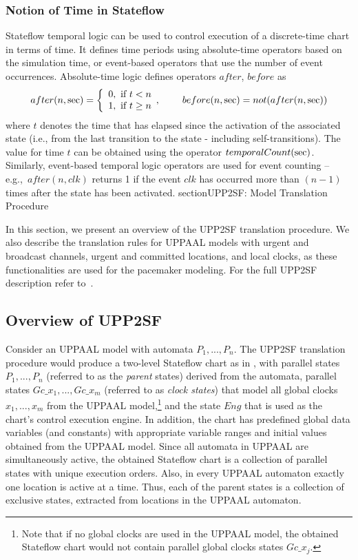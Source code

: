 \subsubsection{Notion of Time in Stateflow}
Stateflow temporal logic can be used to control execution of a discrete-time chart in terms of time. It defines time periods using absolute-time operators based on the simulation time, or event-based operators that use the number of event occurrences. Absolute-time logic defines operators $after$, $before$ as
\begin{equation}
\label{eqn:temp_logic}
after(n, \hbox{sec}) = \left\{
\begin{array}{lr} 0,\hbox{ if } t< n\\
1,\hbox{ if } t\geq n\end{array},
\right.
~~~~~~
before(n, \hbox{sec}) = not(after(n, \hbox{sec}))
\end{equation}
where $t$ denotes the time that has elapsed since the activation of the associated state (i.e., from the last transition to the state - including self-transitions). The value for time $t$ can be obtained using the operator $temporalCount(\hbox{sec})$. Similarly, event-based temporal logic operators are used for event counting -- e.g.,~$after(n,clk)$ returns 1 if the event $clk$ has occurred more than $(n-1)$ times after the state has been activated.
section{UPP2SF: Model Translation Procedure}
\label{sec:upp2sf}

In this section, we present an overview of the UPP2SF translation procedure. We also describe the translation rules for UPPAAL models with urgent and broadcast channels, urgent and committed locations, and local clocks, as these functionalities are used for the pacemaker modeling. For the full UPP2SF description refer to~\cite{upp2sf_rep}. 


\subsection{Overview of UPP2SF}
Consider an UPPAAL model with automata $P_1,...,P_n$. The UPP2SF translation procedure would produce a two-level Stateflow chart as in , with parallel states $P_1,...,P_n$ (referred to as the \textit{parent} states) derived from the automata, parallel states $Gc\_{x_1},..., Gc\_{x_m}$ (referred to as \textit{clock states}) that model all global clocks $x_1,...,x_m$ from the UPPAAL model,\footnote{Note that if no global clocks are used in the UPPAAL model, the obtained Stateflow chart would not contain parallel global clocks states $Gc\_x_j$.}  and the state $Eng$ that is used as the chart's control execution engine.
In addition, the chart has predefined global data variables (and constants) with appropriate variable ranges and initial values obtained from the UPPAAL model. 
Since all automata in UPPAAL are simultaneously active, the obtained Stateflow chart is a collection of parallel states with unique execution orders. Also, in every UPPAAL automaton exactly one location is active at a time. Thus, each of the parent states is a collection of exclusive states, extracted from locations in the UPPAAL automaton.


